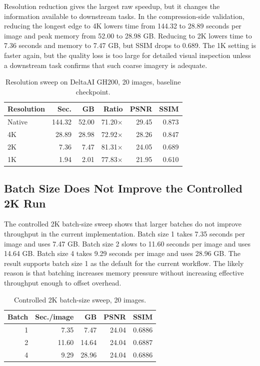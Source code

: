 \documentclass[conference]{IEEEtran}
\begin{document}
Resolution reduction gives the largest raw speedup, but it changes the information available to downstream tasks. In the compression-side validation, reducing the longest edge to 4K lowers time from 144.32 to 28.89 seconds per image and peak memory from 52.00 to 28.98 GB. Reducing to 2K lowers time to 7.36 seconds and memory to 7.47 GB, but SSIM drops to 0.689. The 1K setting is faster again, but the quality loss is too large for detailed visual inspection unless a downstream task confirms that such coarse imagery is adequate.

\begin{table}[t]
\caption{Resolution sweep on DeltaAI GH200, 20 images, baseline checkpoint.}
\label{tab:resolution}
\centering
\begin{tabular}{lrrrrr}
\toprule
Resolution & Sec. & GB & Ratio & PSNR & SSIM\\
\midrule
Native & 144.32 & 52.00 & 71.20$\times$ & 29.45 & 0.873\\
4K & 28.89 & 28.98 & 72.92$\times$ & 28.26 & 0.847\\
2K & 7.36 & 7.47 & 81.31$\times$ & 24.05 & 0.689\\
1K & 1.94 & 2.01 & 77.83$\times$ & 21.95 & 0.610\\
\bottomrule
\end{tabular}
\end{table}

\subsection{Batch Size Does Not Improve the Controlled 2K Run}

The controlled 2K batch-size sweep shows that larger batches do not improve throughput in the current implementation. Batch size 1 takes 7.35 seconds per image and uses 7.47 GB. Batch size 2 slows to 11.60 seconds per image and uses 14.64 GB. Batch size 4 takes 9.29 seconds per image and uses 28.96 GB. The result supports batch size 1 as the default for the current workflow. The likely reason is that batching increases memory pressure without increasing effective throughput enough to offset overhead.

\begin{table}[t]
\caption{Controlled 2K batch-size sweep, 20 images.}
\label{tab:batch}
\centering
\begin{tabular}{rrrrr}
\toprule
Batch & Sec./image & GB & PSNR & SSIM\\
\midrule
1 & 7.35 & 7.47 & 24.04 & 0.6886\\
2 & 11.60 & 14.64 & 24.04 & 0.6887\\
4 & 9.29 & 28.96 & 24.04 & 0.6886\\
\bottomrule
\end{tabular}
\end{table}
\end{document}
